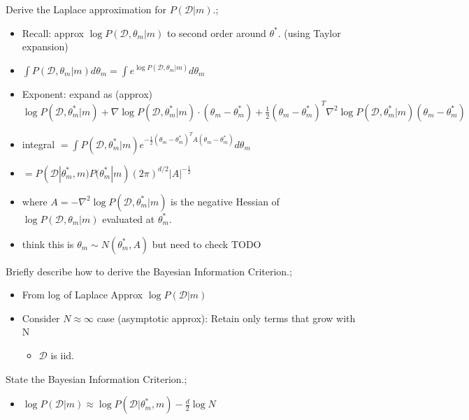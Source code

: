 \documentclass{article}
\begin{document}
Derive the Laplace approximation for $P(\mathcal{D}|m)$.; \begin{itemize} \item Recall: approx $\log P(\mathcal{D},\theta_m|m)$ to second order around $\theta^*$. (using Taylor expansion) \item $\int P(\mathcal{D},\theta_m|m)d\theta_m = \int e^{\log P(\mathcal{D},\theta_m|m)}d\theta_m$ \item Exponent: expand as (approx) $\log P(\mathcal{D},\theta^*_m|m) + \nabla \log P(\mathcal{D},\theta^*_m|m)\cdot (\theta_m-\theta_m^*)+\frac{1}{2}(\theta_m-\theta_m^*)^T\nabla^2\log P(\mathcal{D},\theta^*_m|m)(\theta_m-\theta_m^*)$ \item integral $=\int P(\mathcal{D},\theta^*_m|m)e^{-\frac{1}{2}(\theta_m-\theta_m^*)^TA(\theta_m-\theta_m^*)}d\theta_m$ \item $=P(\mathcal{D}|\theta^*_m, m)P(\theta^*_m|m)(2\pi)^{d/2}|A|^{-\frac{1}{2}}$ \item where $A=-\nabla^2\log P(\mathcal{D},\theta^*_m|m)$ is the negative Hessian of $\log P(\mathcal{D},\theta_m|m)$ evaluated at $\theta^*_m$.  \item think this is $\theta_m \sim N(\theta_m^*, A)$ but need to check TODO \end{itemize}

Briefly describe how to derive the Bayesian Information Criterion.; \begin{itemize} \item From log of Laplace Approx $\log P(\mathcal{D}|m)$ \item Consider $N\approx\infty$ case (asymptotic approx): Retain only terms that grow with N \begin{itemize} \item $\mathcal{D}$ is iid.  \end{itemize} \end{itemize}

State the Bayesian Information Criterion.; \begin{itemize} \item $\log P(\mathcal{D}|m)\approx \log P(\mathcal{D}|\theta^*_m, m)-\frac{d}{2}\log N$ \end{itemize}
\end{document}
